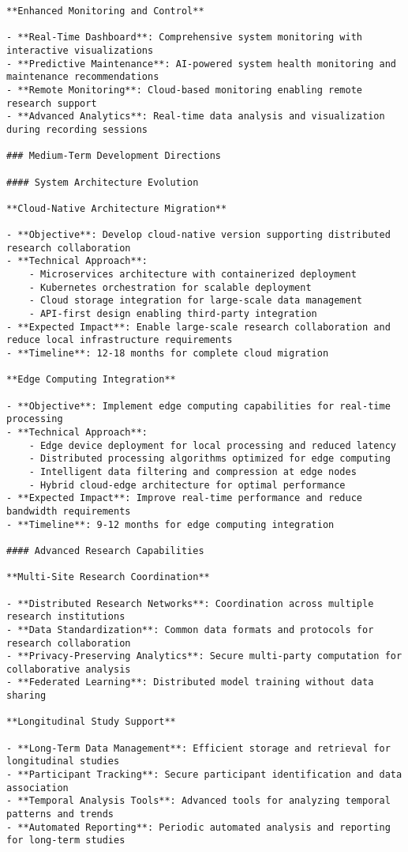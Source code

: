 \documentclass[11pt,a4paper]{report}
\begin{document}
\begin{verbatim}
**Enhanced Monitoring and Control**

- **Real-Time Dashboard**: Comprehensive system monitoring with interactive visualizations
- **Predictive Maintenance**: AI-powered system health monitoring and maintenance recommendations
- **Remote Monitoring**: Cloud-based monitoring enabling remote research support
- **Advanced Analytics**: Real-time data analysis and visualization during recording sessions

### Medium-Term Development Directions

#### System Architecture Evolution

**Cloud-Native Architecture Migration**

- **Objective**: Develop cloud-native version supporting distributed research collaboration
- **Technical Approach**:
    - Microservices architecture with containerized deployment
    - Kubernetes orchestration for scalable deployment
    - Cloud storage integration for large-scale data management
    - API-first design enabling third-party integration
- **Expected Impact**: Enable large-scale research collaboration and reduce local infrastructure requirements
- **Timeline**: 12-18 months for complete cloud migration

**Edge Computing Integration**

- **Objective**: Implement edge computing capabilities for real-time processing
- **Technical Approach**:
    - Edge device deployment for local processing and reduced latency
    - Distributed processing algorithms optimized for edge computing
    - Intelligent data filtering and compression at edge nodes
    - Hybrid cloud-edge architecture for optimal performance
- **Expected Impact**: Improve real-time performance and reduce bandwidth requirements
- **Timeline**: 9-12 months for edge computing integration

#### Advanced Research Capabilities

**Multi-Site Research Coordination**

- **Distributed Research Networks**: Coordination across multiple research institutions
- **Data Standardization**: Common data formats and protocols for research collaboration
- **Privacy-Preserving Analytics**: Secure multi-party computation for collaborative analysis
- **Federated Learning**: Distributed model training without data sharing

**Longitudinal Study Support**

- **Long-Term Data Management**: Efficient storage and retrieval for longitudinal studies
- **Participant Tracking**: Secure participant identification and data association
- **Temporal Analysis Tools**: Advanced tools for analyzing temporal patterns and trends
- **Automated Reporting**: Periodic automated analysis and reporting for long-term studies


\end{verbatim}
\end{document}
